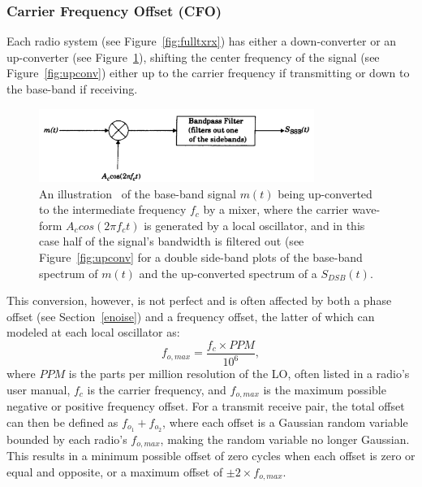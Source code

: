 \subsubsection{Carrier Frequency Offset (CFO)}
\label{cfo}
Each radio system (see Figure~\ref{fig:fulltxrx}) has either a down-converter or an up-converter (see Figure~\ref{fig:mixer}), shifting the center frequency of the signal (see Figure~\ref{fig:upconv}) either up to the carrier frequency if transmitting or down to the base-band if receiving. 

\FloatBarrier
\begin{figure}[ht!]
	\centering	\includegraphics[width=0.8\textwidth,keepaspectratio]{figs/mixer.png}
    \caption{An illustration~\cite{rappaport1996wireless} of the base-band signal $m(t)$ being up-converted to the intermediate frequency $f_c$ by a mixer, where the carrier wave-form $A_c cos(2\pi f_c t)$ is generated by a local oscillator, and in this case half of the signal's bandwidth is filtered out (see Figure~\ref{fig:upconv} for a double side-band plots of the base-band spectrum of $m(t)$ and the up-converted spectrum of a $S_{DSB}(t)$.} 
\label{fig:mixer}      
\end{figure}

This conversion, however, is not perfect and is often affected by both a phase offset (see Section~\ref{enoise}) and a frequency offset, the latter of which can modeled at each local oscillator as:
\begin{equation}
\label{eq:fo}
f_{o,max} = \frac{f_c \times PPM}{10^6},
\end{equation}
where $PPM$ is the parts per million resolution of the LO, often listed in a radio's user manual, $f_c$ is the carrier frequency, and $f_{o,max}$ is the maximum possible negative or positive frequency offset. For a transmit receive pair, the total offset can then be defined as $f_{o_1} + f_{o_2}$, where each offset is a Gaussian random variable bounded by each radio's $f_{o,max}$, making the random variable no longer Gaussian. This results in a minimum possible offset of zero cycles when each offset is zero or equal and opposite, or a maximum offset of $\pm 2 \times f_{o,max}$.


